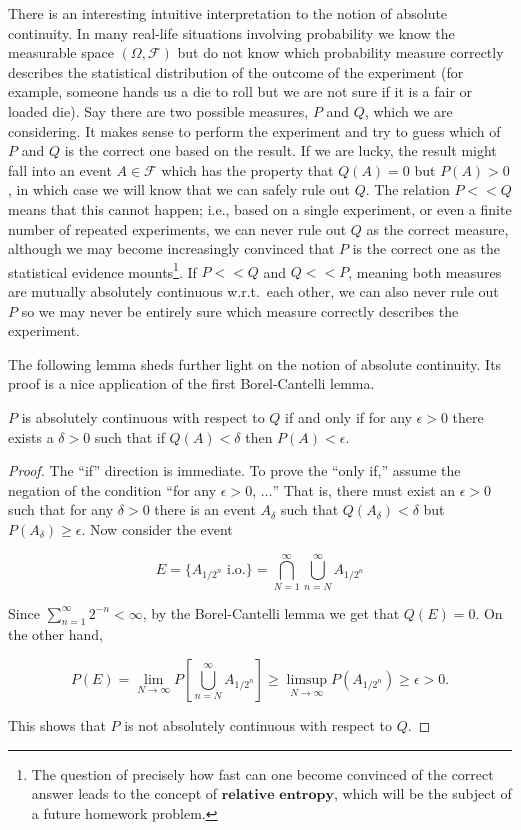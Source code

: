 \noindent There is an interesting intuitive interpretation to
the notion of absolute continuity. In many real-life
situations involving probability we know the
measurable space $(\Omega, \mathcal{F})$ but do not
know which probability measure correctly describes the
statistical distribution of the outcome of the
experiment (for example, someone hands us a die to
roll but we are not sure if it is a fair or loaded
die). Say there are two possible measures, $P$ and
$Q$, which we are considering. It makes sense to
perform the experiment and try to guess which of $P$
and $Q$ is the correct one based on the result. If we
are lucky, the result might fall into an event
$A \in \mathcal{F}$ which has the property that
$Q(A)=0$ but $P(A)>0$, in which case we will know
that we can safely rule out $Q$. The relation $P<<Q$
means that this cannot happen; i.e., based on a single
experiment, or even a finite number of repeated
experiments, we can never rule out $Q$ as the correct
measure, although we may become increasingly convinced
that $P$ is the correct one as the statistical
evidence mounts\footnote{The question of precisely how fast can one become
convinced of the correct answer leads to the concept
of $\textbf{relative entropy}$, which will be the
subject of a future homework problem.}. If $P<<Q$
and $Q<<P$, meaning both measures are mutually
absolutely continuous w.r.t.\ each other, we can also
never rule out $P$ so we may never be entirely sure
which measure correctly describes the experiment.

The following lemma sheds further light on the notion
of absolute continuity. Its proof is a nice
application of the first Borel-Cantelli lemma.

\begin{lem}
\label{lem-abs-cont}
$P$ is absolutely continuous with respect to $Q$ if
and only if for any $\epsilon>0$ there exists a
$\delta>0$ such that if $Q(A)<\delta$ then
$P(A)<\epsilon$.
\end{lem}

\begin{proof}
The ``if'' direction is immediate. To prove the
``only if,'' assume the negation of the condition
``for any $\epsilon>0$, $\ldots$'' That is, there
must exist an $\epsilon>0$ such that for any
$\delta>0$ there is an event $A_\delta$ such that
$Q(A_\delta)< \delta$ but $P(A_\delta)\ge\epsilon$.
Now consider the event

\[
E= \{ A_{1/{2^n}}\textrm{ i.o.} \} =  \bigcap_{N=1}^\infty \bigcup_{n=N}^\infty A_{1/2^n}
\]

\noindent Since $\sum_{n=1}^\infty 2^{-n}<\infty$, by the
Borel-Cantelli lemma we get that $Q(E)=0$. On the
other hand,

\[
P(E) = \lim_{N\to\infty} P\left[\bigcup_{n=N}^\infty A_{1/2^n}\right] \ge \limsup_{N\to\infty} P(A_{1/2^n}) \ge \epsilon>0.
\]

\noindent This shows that $P$ is not absolutely continuous with
respect to $Q$.
\end{proof}

